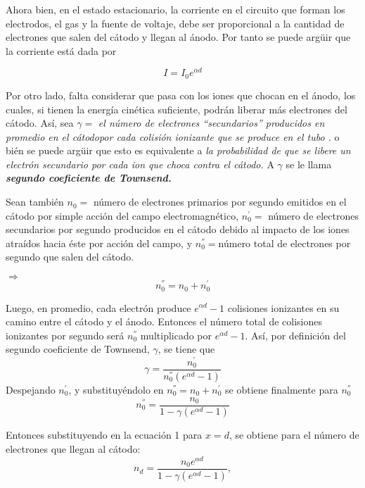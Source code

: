 \documentclass[letterpaper,12pt]{article}
\begin{document}
Ahora bien, en el estado estacionario, la corriente en el circuito que forman los electrodos, el gas y la fuente de voltaje, debe ser proporcional a la cantidad de electrones que salen del cátodo y llegan al ánodo. Por tanto se puede argüir que la corriente está dada por 

\begin{equation}
 I=I_0 e^{\alpha d} \label{corriente1}
\end{equation}

Por otro lado, falta considerar que pasa con los iones que chocan en el ánodo, los cuales, si tienen la energía cinética suficiente, podrán liberar más electrones del cátodo. Así, sea $\gamma=$ \textit{el número de electrones ``secundarios'' producidos en promedio en el cátodopor cada colisión ionizante que se produce en el tubo .} o bién se puede argüir que esto es equivalente a \textit{la probabilidad de que se libere un electrón secundario por cada ion que choca contra el cátodo.} A $\gamma$ se le llama \textbf{\textit{segundo coeficiente de Townsend.}}

Sean también $n_0=$ número de electrones primarios por segundo  emitidos en el cátodo por simple acción del campo electromagnético, $n_0^{'} =$ número de electrones secundarios por segundo producidos en el cátodo debido al impacto de los iones atraídos hacia éste por acción del campo, y $n_0^{''}=  $número total de electrones por segundo que salen del cátodo.

$\Rightarrow$
$$ n_0^{''}=n_0+n_0^{'} $$

Luego, en promedio, cada electrón produce $e^{\alpha d}-1$ colisiones ionizantes en su camino entre el cátodo y el ánodo. Entonces el número total  de colisiones ionizantes por segundo será $n_0^{''}$ multiplicado por $e^{\alpha d}-1$. Así, por definición del segundo coeficiente de Townsend, $\gamma$,  se tiene que
\begin{equation}
\gamma=\frac{n_0^{'}}{n_0^{''}(e^{\alpha d}-1)} \label{2docoef}
\end{equation}
Despejando $n_0^{'}$, y substituyéndolo en $n_0^{''}=n_0+n_0^{'}$  se obtiene finalmente para $n_0^{''}$
\begin{equation}
n_0^{''}=\frac{n_0}{1-\gamma(e^{\alpha d}-1)} \label{relacionalfagamma}
\end{equation}

Entonces substituyendo en la ecuación 1 para $x=d$, se obtiene para el número de electrones que llegan al cátodo:
$$n_d=\frac{n_0e^{\alpha d}}{1-\gamma (e^{\alpha d }-1)},$$
\end{document}
